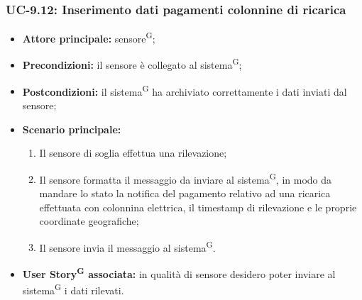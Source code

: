 \documentclass[8pt]{article}
\newcommand{\glossterm}[1]{#1\textsuperscript{G}} %
\begin{document}
\subsubsection*{UC-9.12: Inserimento dati pagamenti colonnine di ricarica}
\begin{itemize}
    \item \textbf{Attore principale:} \glossterm{sensore};
    \item \textbf{Precondizioni:} il sensore è collegato al \glossterm{sistema};
    \item \textbf{Postcondizioni:} il \glossterm{sistema} ha archiviato correttamente i dati inviati dal sensore;
    \item \textbf{Scenario principale:}
        \begin{enumerate}
        \item Il sensore di soglia effettua una rilevazione;
        \item Il sensore formatta il messaggio da inviare al \glossterm{sistema}, in modo da mandare lo stato la notifica del pagamento relativo ad una ricarica effettuata con colonnina elettrica, il timestamp di rilevazione e le proprie coordinate geografiche;
        \item Il sensore invia il messaggio al \glossterm{sistema}.
        \end{enumerate}
    \item \textbf{\glossterm{User Story} associata:} in qualità di sensore desidero poter inviare al \glossterm{sistema} i dati rilevati.
\end{itemize}
\end{document}
